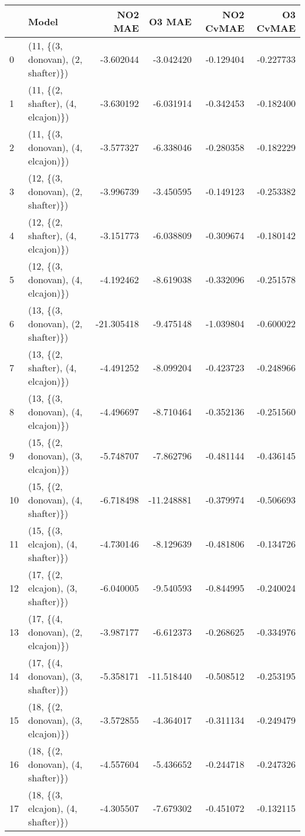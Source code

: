 \begin{tabular}{llrrrr}
\toprule
{} &                               Model &    NO2 MAE &     O3 MAE &  NO2 CvMAE &  O3 CvMAE \\
\midrule
0  &  (11, \{(3, donovan), (2, shafter)\}) &  -3.602044 &  -3.042420 &  -0.129404 & -0.227733 \\
1  &  (11, \{(2, shafter), (4, elcajon)\}) &  -3.630192 &  -6.031914 &  -0.342453 & -0.182400 \\
2  &  (11, \{(3, donovan), (4, elcajon)\}) &  -3.577327 &  -6.338046 &  -0.280358 & -0.182229 \\
3  &  (12, \{(3, donovan), (2, shafter)\}) &  -3.996739 &  -3.450595 &  -0.149123 & -0.253382 \\
4  &  (12, \{(2, shafter), (4, elcajon)\}) &  -3.151773 &  -6.038809 &  -0.309674 & -0.180142 \\
5  &  (12, \{(3, donovan), (4, elcajon)\}) &  -4.192462 &  -8.619038 &  -0.332096 & -0.251578 \\
6  &  (13, \{(3, donovan), (2, shafter)\}) & -21.305418 &  -9.475148 &  -1.039804 & -0.600022 \\
7  &  (13, \{(2, shafter), (4, elcajon)\}) &  -4.491252 &  -8.099204 &  -0.423723 & -0.248966 \\
8  &  (13, \{(3, donovan), (4, elcajon)\}) &  -4.496697 &  -8.710464 &  -0.352136 & -0.251560 \\
9  &  (15, \{(2, donovan), (3, elcajon)\}) &  -5.748707 &  -7.862796 &  -0.481144 & -0.436145 \\
10 &  (15, \{(2, donovan), (4, shafter)\}) &  -6.718498 & -11.248881 &  -0.379974 & -0.506693 \\
11 &  (15, \{(3, elcajon), (4, shafter)\}) &  -4.730146 &  -8.129639 &  -0.481806 & -0.134726 \\
12 &  (17, \{(2, elcajon), (3, shafter)\}) &  -6.040005 &  -9.540593 &  -0.844995 & -0.240024 \\
13 &  (17, \{(4, donovan), (2, elcajon)\}) &  -3.987177 &  -6.612373 &  -0.268625 & -0.334976 \\
14 &  (17, \{(4, donovan), (3, shafter)\}) &  -5.358171 & -11.518440 &  -0.508512 & -0.253195 \\
15 &  (18, \{(2, donovan), (3, elcajon)\}) &  -3.572855 &  -4.364017 &  -0.311134 & -0.249479 \\
16 &  (18, \{(2, donovan), (4, shafter)\}) &  -4.557604 &  -5.436652 &  -0.244718 & -0.247326 \\
17 &  (18, \{(3, elcajon), (4, shafter)\}) &  -4.305507 &  -7.679302 &  -0.451072 & -0.132115 \\

\end{tabular}
